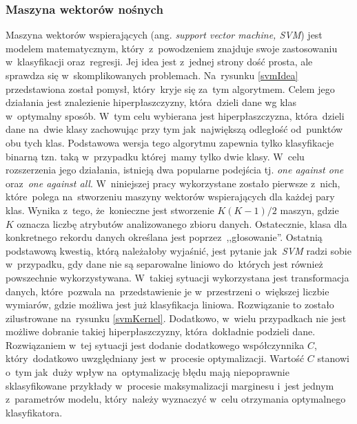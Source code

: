 \subsubsection{Maszyna wektorów nośnych}
Maszyna wektorów wspierających (ang. \textit{support vector machine, SVM}) jest modelem matematycznym, który~z~powodzeniem znajduje swoje zastosowaniu w~klasyfikacji oraz~regresji. Jej idea jest z~jednej strony dość prosta, ale sprawdza się w~skomplikowanych problemach\cite{svm1}. Na~rysunku \ref{svmIdea} przedstawiona został pomysł, który~kryje się za~tym algorytmem. Celem jego działania jest znalezienie hiperpłaszczyzny, która~dzieli dane wg klas w~optymalny sposób. W~tym celu wybierana jest hiperpłaszczyzna, która~dzieli dane na~dwie klasy zachowując przy tym jak~największą odległość od~punktów obu tych klas\cite{svm2}. Podstawowa wersja tego algorytmu zapewnia tylko klasyfikacje binarną tzn. taką w~przypadku której~mamy tylko dwie klasy. W~celu rozszerzenia jego działania, istnieją dwa popularne podejścia  tj. \textit{one against one} oraz~\textit{one against all}\cite{svm3}. W~niniejszej pracy wykorzystane zostało pierwsze z~nich, które~polega na~stworzeniu maszyny wektorów wspierających dla każdej pary klas. Wynika z~tego, że~konieczne jest stworzenie $K(K-1)/2$ maszyn, gdzie ~$K$ oznacza liczbę atrybutów analizowanego zbioru danych. Ostatecznie, klasa dla konkretnego rekordu danych określana jest poprzez~,,głosowanie''. Ostatnią podstawową kwestią, którą należałoby wyjaśnić, jest pytanie jak~\textit{SVM} radzi sobie w~przypadku, gdy dane nie są separowalne liniowo do~których jest również powszechnie wykorzystywana. W~takiej sytuacji wykorzystana jest transformacja danych, które~pozwala na~przedstawienie je w~przestrzeni o~większej liczbie wymiarów, gdzie możliwa jest już klasyfikacja liniowa. Rozwiązanie to zostało zilustrowane na~rysunku \ref{svmKernel}. Dodatkowo, w~wielu przypadkach nie jest możliwe dobranie takiej hiperpłaszczyzny, która~dokładnie podzieli dane. Rozwiązaniem w~tej sytuacji jest dodanie dodatkowego współczynnika $C$, który~dodatkowo uwzględniany jest w~procesie optymalizacji. Wartość $C$ stanowi o~tym jak~duży wpływ na~optymalizację błędu mają niepoprawnie sklasyfikowane przykłady w~procesie maksymalizacji marginesu i~jest jednym z~parametrów modelu, który~należy wyznaczyć w~celu otrzymania optymalnego klasyfikatora. 

